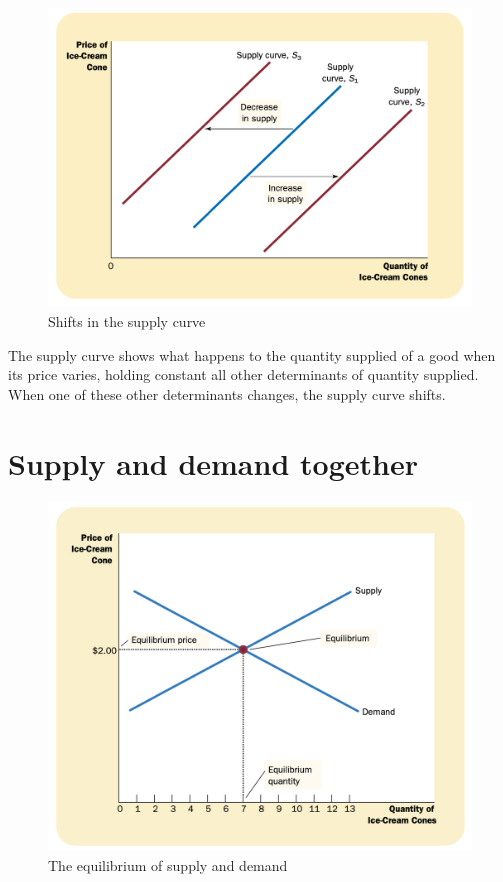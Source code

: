 \begin{figure}[!ht]
  \centering
  \includegraphics[width=\textwidth]{pics/shifts-in-the-supply-curve}
  \caption{Shifts in the supply curve}
  \label{fig:shifts-in-the-supply-curve}
\end{figure}


The supply curve shows what happens to the quantity supplied of a good when its price varies, holding constant all other determinants of quantity supplied.
When one of these other determinants changes, the supply curve shifts.




\section{Supply and demand together}

\begin{figure}[!ht]
  \centering
  \includegraphics[width=\textwidth]{pics/equilibrium-of-supply-and-demand}
  \caption{The equilibrium of supply and demand}
  \label{fig:the-equilibrium-of-supply-and-demand}
\end{figure}

